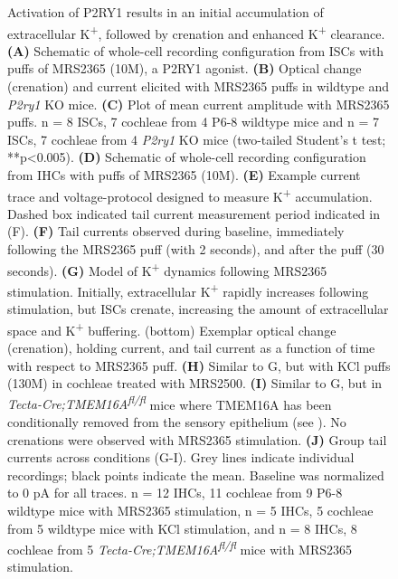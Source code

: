 \documentclass[9pt,lineno]{elife}
\begin{document}
\addtocounter{figure}{-1}
\begin{figure} [t!]
\begin{fullwidth}
  \caption{Activation of P2RY1 results in an initial accumulation of extracellular K\textsuperscript{+}, followed by crenation and enhanced K\textsuperscript{+} clearance.
\textbf{(A)} Schematic of whole-cell recording configuration from ISCs with puffs of MRS2365 (10\textmu M), a P2RY1 agonist.
\textbf{(B)} Optical change (crenation) and current elicited with MRS2365 puffs in wildtype and \textit{P2ry1} KO mice.
\textbf{(C)} Plot of mean current amplitude with MRS2365 puffs. n = 8 ISCs, 7 cochleae from 4 P6-8 wildtype mice and n = 7 ISCs, 7 cochleae from 4 \textit{P2ry1} KO mice (two-tailed Student’s t test; **p<0.005).
\textbf{(D)} Schematic of whole-cell recording configuration from IHCs with puffs of MRS2365 (10\textmu M).
\textbf{(E)} Example current trace and voltage-protocol designed to measure K\textsuperscript{+} accumulation. Dashed box indicated tail current measurement period indicated in (F).
\textbf{(F)} Tail currents observed during baseline, immediately following the MRS2365 puff (with 2 seconds), and after the puff (30 seconds).
\textbf{(G)} Model of K\textsuperscript{+} dynamics following MRS2365 stimulation. Initially, extracellular K\textsuperscript{+} rapidly increases following stimulation, but ISCs crenate, increasing the amount of extracellular space and K\textsuperscript{+} buffering. (bottom) Exemplar optical change (crenation), holding current, and tail current as a function of time with respect to MRS2365 puff.
\textbf{(H)} Similar to G, but with KCl puffs (130\textmu M) in cochleae treated with MRS2500.
\textbf{(I)} Similar to G, but in \textit{Tecta-Cre;TMEM16A\textsuperscript{fl/fl}} mice where TMEM16A has been conditionally removed from the sensory epithelium (see ). No crenations were observed with MRS2365 stimulation.
\textbf{(J)} Group tail currents across conditions (G-I). Grey lines indicate individual recordings; black points indicate the mean. Baseline was normalized to 0 pA for all traces. n = 12 IHCs, 11 cochleae from 9 P6-8 wildtype mice with MRS2365 stimulation, n = 5 IHCs, 5 cochleae from 5 wildtype mice with KCl stimulation, and n = 8 IHCs, 8 cochleae from 5 \textit{Tecta-Cre;TMEM16A\textsuperscript{fl/fl}} mice with MRS2365 stimulation.
}
\end{fullwidth}
\end{figure}
\end{document}

